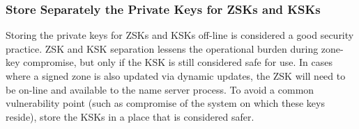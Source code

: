 
\subsubsection{Store Separately the Private Keys for ZSKs and KSKs}

Storing the private keys for ZSKs and KSKs off-line is considered a good
security practice.  ZSK and KSK separation lessens the operational burden
during zone-key compromise, but only if the KSK is still considered safe for
use.  In cases where a signed zone is also updated via dynamic updates, the
ZSK will need to be on-line and available to the name server process.  To
avoid a common vulnerability point (such as compromise of the system on which
these keys reside), store the KSKs in a place that is considered safer.

